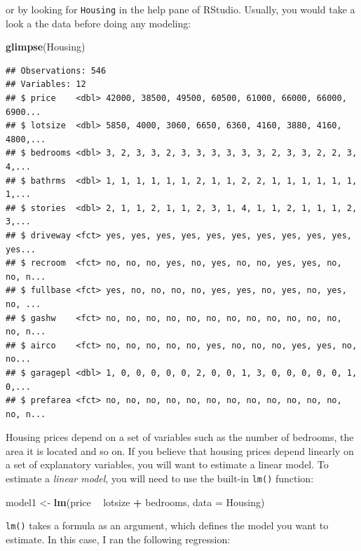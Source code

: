 \documentclass[]{gitbook}
\newenvironment{Shaded}{\begin{snugshade}}{\end{snugshade}}
\newcommand{\DataTypeTok}[1]{\textcolor[rgb]{0.13,0.29,0.53}{#1}}
\newcommand{\KeywordTok}[1]{\textcolor[rgb]{0.13,0.29,0.53}{\textbf{#1}}}
\newcommand{\NormalTok}[1]{#1}
\newcommand{\OperatorTok}[1]{\textcolor[rgb]{0.81,0.36,0.00}{\textbf{#1}}}
\newcommand{\StringTok}[1]{\textcolor[rgb]{0.31,0.60,0.02}{#1}}
\begin{document}
or by looking for \texttt{Housing} in the help pane of RStudio. Usually, you would take a look a the data
before doing any modeling:

\begin{Shaded}
\begin{Highlighting}[]
\KeywordTok{glimpse}\NormalTok{(Housing)}
\end{Highlighting}
\end{Shaded}

\begin{verbatim}
## Observations: 546
## Variables: 12
## $ price    <dbl> 42000, 38500, 49500, 60500, 61000, 66000, 66000, 6900...
## $ lotsize  <dbl> 5850, 4000, 3060, 6650, 6360, 4160, 3880, 4160, 4800,...
## $ bedrooms <dbl> 3, 2, 3, 3, 2, 3, 3, 3, 3, 3, 3, 2, 3, 3, 2, 2, 3, 4,...
## $ bathrms  <dbl> 1, 1, 1, 1, 1, 1, 2, 1, 1, 2, 2, 1, 1, 1, 1, 1, 1, 1,...
## $ stories  <dbl> 2, 1, 1, 2, 1, 1, 2, 3, 1, 4, 1, 1, 2, 1, 1, 1, 2, 3,...
## $ driveway <fct> yes, yes, yes, yes, yes, yes, yes, yes, yes, yes, yes...
## $ recroom  <fct> no, no, no, yes, no, yes, no, no, yes, yes, no, no, n...
## $ fullbase <fct> yes, no, no, no, no, yes, yes, no, yes, no, yes, no, ...
## $ gashw    <fct> no, no, no, no, no, no, no, no, no, no, no, no, no, n...
## $ airco    <fct> no, no, no, no, no, yes, no, no, no, yes, yes, no, no...
## $ garagepl <dbl> 1, 0, 0, 0, 0, 0, 2, 0, 0, 1, 3, 0, 0, 0, 0, 0, 1, 0,...
## $ prefarea <fct> no, no, no, no, no, no, no, no, no, no, no, no, no, n...
\end{verbatim}

Housing prices depend on a set of variables such as the number of bedrooms, the area it is located
and so on. If you believe that housing prices depend linearly on a set of explanatory variables,
you will want to estimate a linear model. To estimate a \emph{linear model}, you will need to use the
built-in \texttt{lm()} function:

\begin{Shaded}
\begin{Highlighting}[]
\NormalTok{model1 <-}\StringTok{ }\KeywordTok{lm}\NormalTok{(price }\OperatorTok{~}\StringTok{ }\NormalTok{lotsize }\OperatorTok{+}\StringTok{ }\NormalTok{bedrooms, }\DataTypeTok{data =}\NormalTok{ Housing)}
\end{Highlighting}
\end{Shaded}

\texttt{lm()} takes a formula as an argument, which defines the model you want to estimate. In this case,
I ran the following regression:
\end{document}
